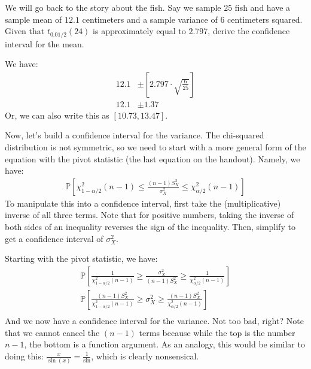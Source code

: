
We will go back to the story about the fish. Say we sample $25$ fish and
have a sample mean of $12.1$ centimeters and a sample variance of $6$
centimeters squared. Given that $t_{0.01/2}(24)$ is approximately equal
to $2.797$, derive the confidence interval for the mean.



We have:
\begin{align*}
12.1 &\pm \left[ 2.797 \cdot \sqrt{\frac{6}{25}} \right] \\
12.1 &\pm 1.37
\end{align*}
Or, we can also write this as $[10.73, 13.47]$.


Now, let's build a confidence interval for the variance. The chi-squared 
distribution is not symmetric, so we need to start with a more general
form of the equation with the pivot statistic (the last equation on the
handout). Namely, we have:
\begin{align*}
\mathbb{P}\left[ \chi^2_{1 - \alpha/2}(n-1) \leq \frac{(n-1)S^2_X}{\sigma_X^2} \leq \chi^2_{\alpha/2}(n-1) \right]
\end{align*}
To manipulate this into a confidence interval, first take the (multiplicative)
inverse of all three terms. Note that for positive numbers, taking the inverse
of both sides of an inequality reverses the sign of the inequality. Then,
simplify to get a confidence interval of $\sigma_X^2$.


Starting with the pivot statistic, we have:
\begin{align*}
\mathbb{P}\left[ \frac{1}{\chi^2_{1 - \alpha/2}(n-1)} \geq \frac{\sigma_X^2}{(n-1)S^2_X} \geq \frac{1}{\chi^2_{\alpha/2}(n-1)} \right] \\
\mathbb{P}\left[ \frac{(n-1)S^2_X}{\chi^2_{1 - \alpha/2}(n-1)} \geq \sigma_X^2 \geq \frac{(n-1)S^2_X}{\chi^2_{\alpha/2}(n-1)} \right] \\
\end{align*}
And we now have a confidence interval for the variance. Not too bad, right?
Note that we cannot cancel the $(n-1)$ terms because while the top is the number
$n-1$, the bottom is a function argument. As an analogy, this would be similar 
to doing this: $\frac{x}{\sin(x)} = \frac{1}{\sin}$, which is clearly nonsensical.

